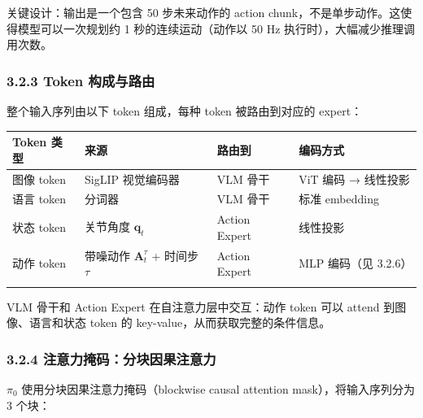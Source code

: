 \documentclass[
  chinese,
]{ctexart}
\begin{document}
关键设计：输出是一个包含 50 步未来动作的 action
chunk，不是单步动作。这使得模型可以一次规划约 1 秒的连续运动（动作以 50
Hz 执行时），大幅减少推理调用次数。

\subsubsection{3.2.3 Token
构成与路由}\label{token-ux6784ux6210ux4e0eux8defux7531}

整个输入序列由以下 token 组成，每种 token 被路由到对应的 expert：

\begin{center}
\begin{tabular}{@{}>{\raggedright\arraybackslash}p{} >{\raggedright\arraybackslash}p{} >{\raggedright\arraybackslash}p{} >{\raggedright\arraybackslash}p{}@{}}
\toprule\noalign{}
Token 类型 & 来源 & 路由到 & 编码方式 \\
\midrule\noalign{}
图像 token & SigLIP 视觉编码器 & VLM 骨干 & ViT 编码 → 线性投影 \\
语言 token & 分词器 & VLM 骨干 & 标准 embedding \\
状态 token & 关节角度 \(\mathbf{q}_t\) & Action Expert & 线性投影 \\
动作 token & 带噪动作 \(\mathbf{A}^\tau_t\) + 时间步 \(\tau\) & Action Expert & MLP 编码（见 3.2.6） \\
\bottomrule\noalign{}
\end{tabular}
\end{center}

VLM 骨干和 Action Expert 在自注意力层中交互：动作 token 可以 attend
到图像、语言和状态 token 的 key-value，从而获取完整的条件信息。

\subsubsection{3.2.4
注意力掩码：分块因果注意力}\label{ux6ce8ux610fux529bux63a9ux7801ux5206ux5757ux56e0ux679cux6ce8ux610fux529b}

\(\pi_0\) 使用分块因果注意力掩码（blockwise causal attention
mask），将输入序列分为 3 个块：
\end{document}
